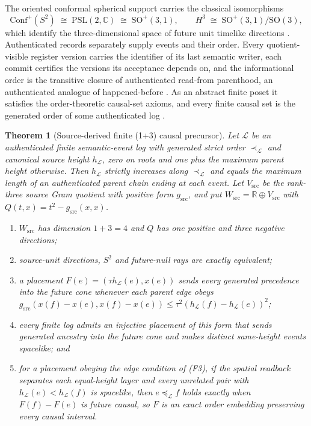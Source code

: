 \documentclass[11pt]{article}
\newtheorem{theorem}{Theorem}[section]
\theoremstyle{definition}
\theoremstyle{remark}
\begin{document}
The oriented conformal spherical support carries the classical isomorphisms
\begin{equation}
\mathrm{Conf}^{+}(S^{2})\;\cong\;\mathrm{PSL}(2,\mathbb C)\;\cong\;
\mathrm{SO}^{+}(3,1),
\qquad
H^{3}\;\cong\;\mathrm{SO}^{+}(3,1)/\mathrm{SO}(3),
\label{eq:lorentz}
\end{equation}
which identify the three-dimensional space of future unit timelike
directions \cite{ratcliffe2019}. Authenticated records separately supply
events and their order. Every quotient-visible register version carries the
identifier of its last semantic writer, each commit certifies the versions
its acceptance depends on, and the informational order is the transitive
closure of authenticated read-from parenthood, an authenticated analogue of
happened-before \cite{lamport1978}. As an abstract finite poset it satisfies
the order-theoretic causal-set axioms, and every finite causal set is the
generated order of some authenticated log \cite{ophrepo}.

\begin{theorem}[Source-derived finite (1+3) causal precursor]
\label{thm:source-causal-precursor}
Let $\mathcal L$ be an authenticated finite semantic-event log with generated strict
order $\prec_{\mathcal L}$ and canonical source height $h_{\mathcal L}$, zero on roots and one
plus the maximum parent height otherwise. Then $h_{\mathcal L}$ strictly increases along
$\prec_{\mathcal L}$ and equals the maximum length of an authenticated parent chain
ending at each event. Let $V_{\mathrm{src}}$ be the rank-three source Gram
quotient with positive form $g_{\mathrm{src}}$, and put
$W_{\mathrm{src}}=\mathbb R\oplus V_{\mathrm{src}}$ with
$Q(t,x)=t^2-g_{\mathrm{src}}(x,x)$.
\begin{enumerate}[label=(F\arabic*),leftmargin=2.4em]
\item $W_{\mathrm{src}}$ has dimension $1+3=4$ and $Q$ has one positive and
three negative directions;
\item source-unit directions, $S^2$ and future-null rays are exactly
equivalent;
\item a placement $F(e)=(\tau h_{\mathcal L}(e),x(e))$ sends every generated precedence
into the future cone whenever each parent edge obeys
$g_{\mathrm{src}}(x(f)-x(e),x(f)-x(e))\leq\tau^2(h_{\mathcal L}(f)-h_{\mathcal L}(e))^2$;
\item every finite log admits an injective placement of this form that sends
generated ancestry into the future cone and makes distinct same-height events
spacelike; and
\item for a placement obeying the edge condition of (F3), if the spatial
readback separates each equal-height layer and every unrelated pair with
$h_{\mathcal L}(e)<h_{\mathcal L}(f)$ is spacelike, then $e\preceq_{\mathcal L} f$ holds
exactly when $F(f)-F(e)$ is future causal, so $F$ is an exact order
embedding preserving every causal interval.
\end{enumerate}
\end{theorem}
\end{document}
